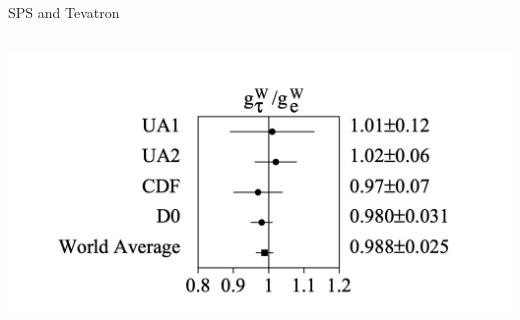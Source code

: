 \begin{frame}{}
\begin{block}{SPS and Tevatron}
\begin{columns}
            \centering
            \includegraphics[width=\textwidth]{chapters/Introduction/sectionRelatedWorks/figures/spsTevatron.png}
        \end{columns}
    \end{block}
\end{frame}



